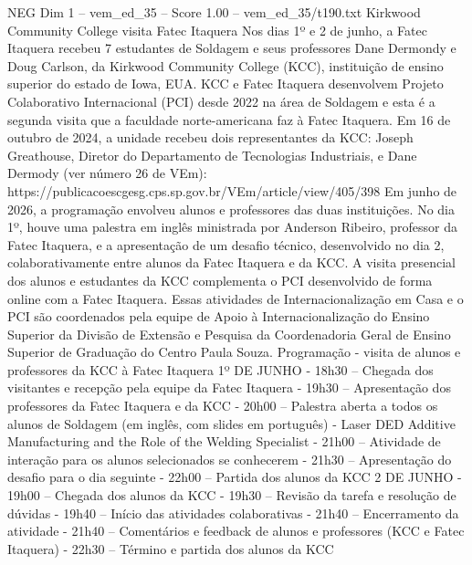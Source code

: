 \begin{textsample}{NEG Dim 1 – vem\_ed\_35 – Score 1.00 – vem\_ed\_35/t190.txt}  \label{ex:f1_neg_049}
Kirkwood Community College visita Fatec Itaquera Nos dias 1º e 2 de junho, a Fatec Itaquera recebeu 7 estudantes de Soldagem e seus professores Dane Dermondy e Doug Carlson, da Kirkwood Community College (KCC), instituição de ensino superior do estado de Iowa, EUA.
KCC e Fatec Itaquera desenvolvem Projeto Colaborativo Internacional (PCI) desde 2022 na área de Soldagem e esta é a segunda visita que a faculdade norte-americana faz à Fatec Itaquera.
Em 16 de outubro de 2024, a unidade recebeu dois representantes da KCC: Joseph Greathouse, Diretor do Departamento de Tecnologias Industriais, e Dane Dermody (ver número 26 de VEm): https://publicacoescgesg.cps.sp.gov.br/VEm/article/view/405/398 Em junho de 2026, a programação envolveu alunos e professores das duas instituições.
No dia 1º, houve uma palestra em inglês ministrada por Anderson Ribeiro, professor da Fatec Itaquera, e a apresentação de um desafio técnico, desenvolvido no dia 2, colaborativamente entre alunos da Fatec Itaquera e da KCC.
A visita presencial dos alunos e estudantes da KCC complementa o PCI desenvolvido de forma online com a Fatec Itaquera.
Essas atividades de Internacionalização em Casa e o PCI são coordenados pela equipe de Apoio à Internacionalização do Ensino Superior da Divisão de Extensão e Pesquisa da Coordenadoria Geral de Ensino Superior de Graduação do Centro Paula Souza.
Programação - visita de alunos e professores da KCC à Fatec Itaquera 1º DE JUNHO - 18h30 – Chegada dos visitantes e recepção pela equipe da Fatec Itaquera - 19h30 – Apresentação dos professores da Fatec Itaquera e da KCC - 20h00 – Palestra aberta a todos os alunos de Soldagem (em inglês, com slides em português) - Laser DED Additive Manufacturing and the Role of the Welding Specialist - 21h00 – Atividade de interação para os alunos selecionados se conhecerem - 21h30 – Apresentação do desafio para o dia seguinte - 22h00 – Partida dos alunos da KCC 2 DE JUNHO - 19h00 – Chegada dos alunos da KCC - 19h30 – Revisão da tarefa e resolução de dúvidas - 19h40 – Início das atividades colaborativas - 21h40 – Encerramento da atividade - 21h40 – Comentários e feedback de alunos e professores (KCC e Fatec Itaquera) - 22h30 – Término e partida dos alunos da KCC

\end{textsample}
